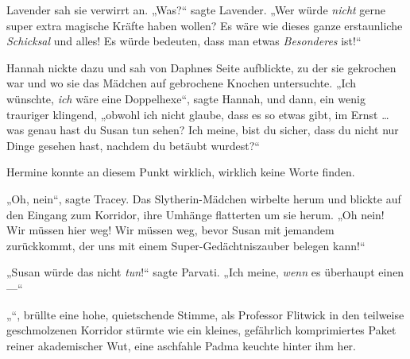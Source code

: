 Lavender sah sie verwirrt an.
„Was?“ sagte Lavender.
„Wer würde \emph{nicht} gerne super extra magische Kräfte haben wollen? Es wäre wie dieses ganze erstaunliche \emph{Schicksal} und alles! Es würde bedeuten, dass man etwas \emph{Besonderes} ist!“

Hannah nickte dazu und sah von Daphnes Seite aufblickte, zu der sie gekrochen war und wo sie das Mädchen auf gebrochene Knochen untersuchte.
„Ich wünschte, \emph{ich} wäre eine Doppelhexe“, sagte Hannah, und dann, ein wenig trauriger klingend, „obwohl ich nicht glaube, dass es so etwas gibt, im Ernst … was genau hast du Susan tun sehen? Ich meine, bist du sicher, dass du nicht nur Dinge gesehen hast, nachdem du betäubt wurdest?“

Hermine konnte an diesem Punkt wirklich, wirklich keine Worte finden.

„Oh, nein“, sagte Tracey. Das Slytherin-Mädchen wirbelte herum und blickte auf den Eingang zum Korridor, ihre Umhänge flatterten um sie herum.
„Oh nein! Wir müssen hier weg! Wir müssen weg, bevor Susan mit jemandem zurückkommt, der uns mit einem Super-Gedächtniszauber belegen kann!“

„Susan würde das nicht \emph{tun}!“ sagte Parvati.
„Ich meine, \emph{wenn} es überhaupt einen —“

„“, brüllte eine hohe, quietschende Stimme, als Professor Flitwick in den teilweise geschmolzenen Korridor stürmte wie ein kleines, gefährlich komprimiertes Paket reiner akademischer Wut, eine aschfahle Padma keuchte hinter ihm her.

